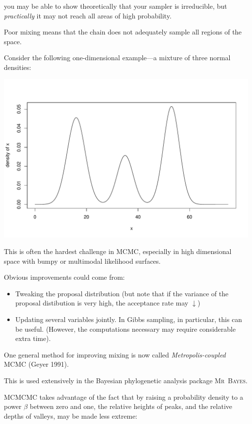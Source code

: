 \ie{} you may be able to show theoretically that your sampler is irreducible, but {\em practically} it may not reach all areas of high probability.

Poor mixing means that the chain does not adequately sample all regions of the space.  

Consider the following one-dimensional example---a mixture of  three normal densities:

\newpage
\begin{center}
\includegraphics[width=\textwidth]{illus/3peak.pdf}
\end{center}
\enlargethispage*{1000pt}

This is often the hardest challenge in MCMC, especially in high dimensional  space with bumpy or multimodal likelihood surfaces.  

Obvious improvements could come from:
\begin{itemize}
\item Tweaking the proposal distribution (but note that if the variance of the proposal distibution is very high, the acceptance rate may $\downarrow$)
\item Updating several variables jointly. In Gibbs sampling, in particular, this can be useful.  (However, the computations necessary may require considerable extra time).
\end{itemize}

One general method for improving mixing is now called {\em Metropolis-coupled} MCMC (Geyer 1991).  

This is used extensively in the Bayesian phylogenetic analysis package \textsc{Mr~Bayes}.

MCMCMC takes advantage of the fact that by raising a probability density to a power $\beta$ between zero and one, the relative heights of peaks, and the relative depths of valleys, may be made less extreme:

